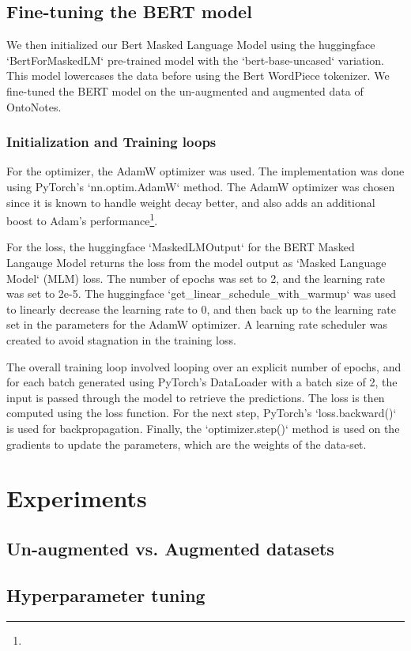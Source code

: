 \documentclass[10pt]{article}
\begin{document}
\subsection{Fine-tuning the BERT model}
We then initialized our Bert Masked Language Model using the huggingface `BertForMaskedLM` pre-trained model with the `bert-base-uncased` variation. This model lowercases the data before using the Bert WordPiece tokenizer. We fine-tuned the BERT model on the un-augmented and augmented data of OntoNotes. 

\subsubsection{Initialization and Training loops}
For the optimizer, the AdamW optimizer was used. The implementation was done using PyTorch's `nn.optim.AdamW` method. The AdamW optimizer was chosen since it is known to handle weight decay better, and also adds an additional boost to Adam's performance\footnote{}.

For the loss, the huggingface `MaskedLMOutput` for the BERT Masked Langauge Model returns the loss from the model output as `Masked Language Model` (MLM) loss. 
The number of epochs was set to 2, and the learning rate was set to 2e-5. The huggingface `get\_linear\_schedule\_with\_warmup` was used to linearly decrease the learning rate to 0, and then back up to the learning rate set in the parameters for the AdamW optimizer. A learning rate scheduler was created to avoid stagnation in the training loss.

The overall training loop involved looping over an explicit number of epochs, and for each batch generated using PyTorch's DataLoader with a batch size of 2, the input is passed through the model to retrieve the predictions. The loss is then computed using the loss function. For the next step, PyTorch's `loss.backward()` is used for backpropagation. Finally, the `optimizer.step()` method is used on the gradients to update the parameters, which are the weights of the data-set.

\section{Experiments}
\subsection{Un-augmented vs. Augmented datasets}


\subsection{Hyperparameter tuning}
\end{document}
